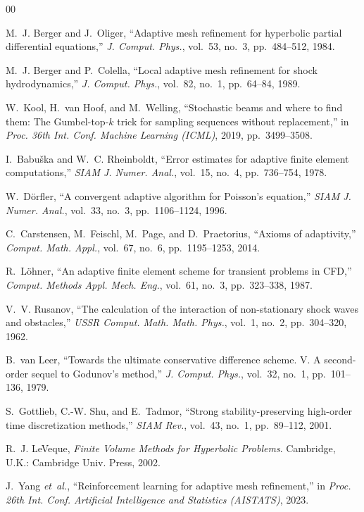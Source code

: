 \documentclass[conference]{IEEEtran}
\begin{document}
\begin{thebibliography}{00}

M.~J. Berger and J.~Oliger, ``Adaptive mesh refinement for hyperbolic partial differential equations,'' \textit{J. Comput. Phys.}, vol.~53, no.~3, pp.~484--512, 1984.

M.~J. Berger and P.~Colella, ``Local adaptive mesh refinement for shock hydrodynamics,'' \textit{J. Comput. Phys.}, vol.~82, no.~1, pp.~64--84, 1989.

W.~Kool, H.~van Hoof, and M.~Welling, ``Stochastic beams and where to find them: The Gumbel-top-$k$ trick for sampling sequences without replacement,'' in \textit{Proc. 36th Int. Conf. Machine Learning (ICML)}, 2019, pp.~3499--3508.

I.~Babu\v{s}ka and W.~C. Rheinboldt, ``Error estimates for adaptive finite element computations,'' \textit{SIAM J. Numer. Anal.}, vol.~15, no.~4, pp.~736--754, 1978.

W.~D\"orfler, ``A convergent adaptive algorithm for Poisson's equation,'' \textit{SIAM J. Numer. Anal.}, vol.~33, no.~3, pp.~1106--1124, 1996.

C.~Carstensen, M.~Feischl, M.~Page, and D.~Praetorius, ``Axioms of adaptivity,'' \textit{Comput. Math. Appl.}, vol.~67, no.~6, pp.~1195--1253, 2014.

R.~L\"ohner, ``An adaptive finite element scheme for transient problems in CFD,'' \textit{Comput. Methods Appl. Mech. Eng.}, vol.~61, no.~3, pp.~323--338, 1987.

V.~V. Rusanov, ``The calculation of the interaction of non-stationary shock waves and obstacles,'' \textit{USSR Comput. Math. Math. Phys.}, vol.~1, no.~2, pp.~304--320, 1962.

B.~van Leer, ``Towards the ultimate conservative difference scheme. V. A second-order sequel to Godunov's method,'' \textit{J. Comput. Phys.}, vol.~32, no.~1, pp.~101--136, 1979.

S.~Gottlieb, C.-W. Shu, and E.~Tadmor, ``Strong stability-preserving high-order time discretization methods,'' \textit{SIAM Rev.}, vol.~43, no.~1, pp.~89--112, 2001.

R.~J. LeVeque, \textit{Finite Volume Methods for Hyperbolic Problems}. Cambridge, U.K.: Cambridge Univ. Press, 2002.

J.~Yang \textit{et~al.}, ``Reinforcement learning for adaptive mesh refinement,'' in \textit{Proc. 26th Int. Conf. Artificial Intelligence and Statistics (AISTATS)}, 2023.

\end{thebibliography}
\end{document}
